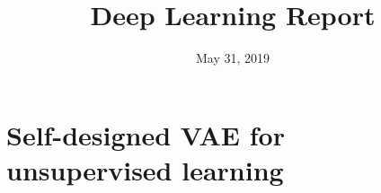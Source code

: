 \documentclass[11pt, a4paper]{article} %
\title{Deep Learning Report} %
\begin{document}


\date{May 31, 2019}

\maketitle{} %

\setcounter{page}{1} %

\section{Self-designed VAE for unsupervised learning} %
\end{document}
